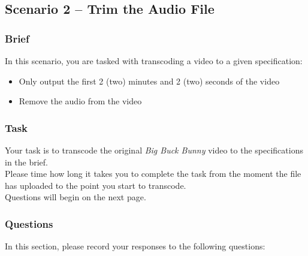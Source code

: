 \subsection{Scenario 2 – Trim the Audio File}
\subsubsection{Brief}
In this scenario, you are tasked with transcoding a video to a given specification:
\begin{itemize}
    \item Only output the first 2 (two) minutes and 2 (two) seconds of the video
    \item Remove the audio from the video
\end{itemize}

\subsubsection{Task}
Your task is to transcode the original \emph{Big Buck Bunny} video to the specifications in the brief. \\
Please time how long it takes you to complete the task from the moment the file has uploaded to the point you start to transcode. \\
Questions will begin on the next page.

\clearpage

\subsubsection{Questions}

In this section, please record your responses to the following questions:

